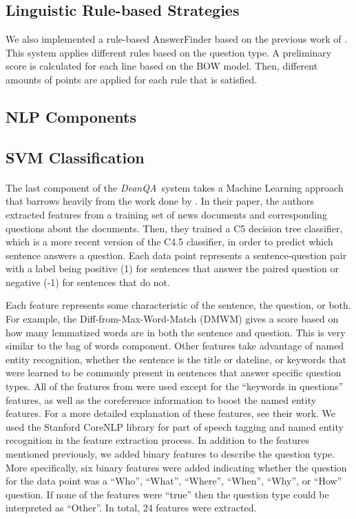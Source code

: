 \documentclass[11pt,letterpaper]{article}
\newcommand{\name}{\emph{DeanQA~}}
\begin{document}
\subsection{Linguistic Rule-based Strategies}

We also implemented a rule-based AnswerFinder based on the previous
work of \cite{riloff2000}. This system applies different rules based
on the question type. A preliminary score is calculated for each line
based on the BOW model. Then, different amounts of points are applied
for each rule that is satisfied.

\subsection{NLP Components}


\subsection{SVM Classification}
\paragraph{}
The last component of the \name system takes a Machine Learning approach that barrows heavily 
from the work done by \cite{Ng00amachine}.  In their paper, the authors extracted features from a training
set of news documents and corresponding questions about the documents.  Then, they trained a C5 
decision tree classifier, which is a more recent version of the C4.5  \cite{Quinlan:1993:CPM:152181} classifier, 
in order to predict which sentence answers a question.  Each data point represents a sentence-question pair with a 
label being positive (1) for sentences that answer the paired question or negative (-1) 
for sentences that do not.

Each feature represents some characteristic of the sentence, the question, or both.  
For example, the Diff-from-Max-Word-Match (DMWM) gives a score based on how many lemmatized 
words are in both the sentence and question.  This is very similar to the bag of words component. 
 Other features take advantage of named entity recognition, whether the sentence is the title or dateline, 
or keywords that were learned to be commonly present in sentences that answer specific question types. 
 All of the features from \cite{Ng00amachine} were used except for the ``keywords in questions'' features,
 as well as the coreference information to boost the named entity features.  For a more detailed explanation 
 of these features, see their work.  We used the Stanford CoreNLP library for part of speech tagging 
 \cite{Toutanova00enrichingthe} and named entity recognition \cite{Finkel05incorporatingnon-local} in the feature extraction
 process.  In addition to the features mentioned previously, we added binary features 
 to describe the question type.  More specifically, six binary features were added indicating whether the question 
 for the data point was a ``Who'', ``What'', ``Where'', ``When'', ``Why'', or ``How'' question.  If none of 
 the features were ``true'' then the question type could be interpreted as ``Other''.   In total, 24 features 
 were extracted.
\end{document}

